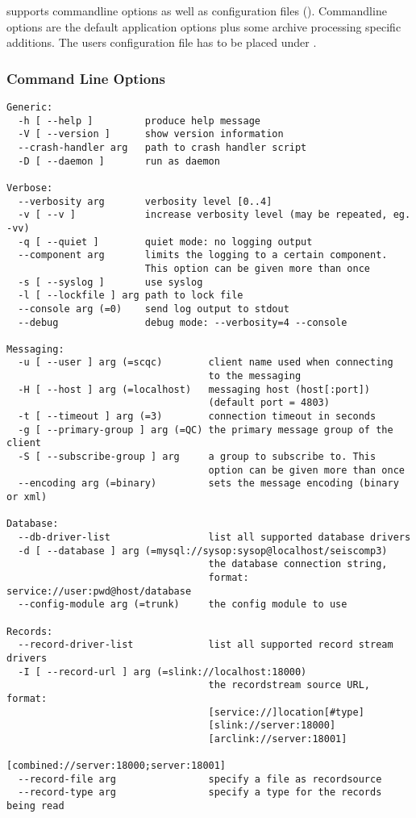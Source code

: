 \noindent
{} supports commandline options as well as configuration files ().
Commandline options are the default application options plus some archive processing specific additions. The users configuration file has to be placed under .

\subsubsection{Command Line Options}
\begin{small}
\begin{verbatim}
Generic:
  -h [ --help ]         produce help message
  -V [ --version ]      show version information
  --crash-handler arg   path to crash handler script
  -D [ --daemon ]       run as daemon

Verbose:
  --verbosity arg       verbosity level [0..4]
  -v [ --v ]            increase verbosity level (may be repeated, eg. -vv)
  -q [ --quiet ]        quiet mode: no logging output
  --component arg       limits the logging to a certain component.
                        This option can be given more than once
  -s [ --syslog ]       use syslog
  -l [ --lockfile ] arg path to lock file
  --console arg (=0)    send log output to stdout
  --debug               debug mode: --verbosity=4 --console

Messaging:
  -u [ --user ] arg (=scqc)        client name used when connecting
                                   to the messaging
  -H [ --host ] arg (=localhost)   messaging host (host[:port])
                                   (default port = 4803)
  -t [ --timeout ] arg (=3)        connection timeout in seconds
  -g [ --primary-group ] arg (=QC) the primary message group of the client
  -S [ --subscribe-group ] arg     a group to subscribe to. This
                                   option can be given more than once
  --encoding arg (=binary)         sets the message encoding (binary or xml)

Database:
  --db-driver-list                 list all supported database drivers
  -d [ --database ] arg (=mysql://sysop:sysop@localhost/seiscomp3)
                                   the database connection string,
                                   format: service://user:pwd@host/database
  --config-module arg (=trunk)     the config module to use

Records:
  --record-driver-list             list all supported record stream drivers
  -I [ --record-url ] arg (=slink://localhost:18000)
                                   the recordstream source URL, format:
                                   [service://]location[#type]
                                   [slink://server:18000]
                                   [arclink://server:18001]
                                   [combined://server:18000;server:18001]
  --record-file arg                specify a file as recordsource
  --record-type arg                specify a type for the records being read


\end{verbatim}
\end{small}
